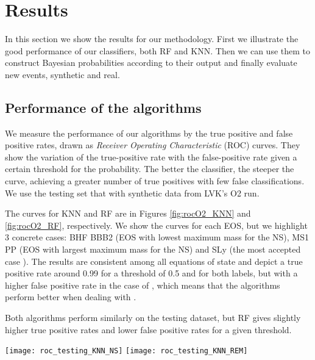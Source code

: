 \section{Results\label{results}}
In this section we show the results for our methodology. First we illustrate the good performance of our classifiers, both \ac{RF} and \ac{KNN}. Then we can use them to construct Bayesian probabilities according to their output and finally evaluate new events, synthetic and real.

\subsection{Performance of the algorithms}
We measure the performance of our algorithms by the true positive and false positive rates, drawn as \textit{Receiver Operating Characteristic} (ROC) curves. They show the variation of the true-positive rate  with the false-positive rate given a certain threshold for the probability.  The better the classifier, the steeper the curve,  achieving a greater number of true positives with few false classifications. We use the testing set that with synthetic data from LVK's O2 run. 

The curves for \ac{KNN}  and \ac{RF} are in Figures \ref{fig:rocO2_KNN} and \ref{fig:rocO2_RF}, respectively.  We show the curves for each EOS, but we highlight 3 concrete cases: BHF BBB2 (EOS with lowest maximum mass for the NS), MS1 PP (EOS with largest maximum mass for the NS) and SLy (the most accepted case \mmt{[?]}). The results are consistent among all equations of state and depict a true positive rate around 0.99 for a threshold of 0.5 and for both labels, but with a higher false positive rate in the case of \hasns, which means that the algorithms perform better when dealing with \hasrem.

Both algorithms perform similarly on the testing dataset, but \ac{RF} gives slightly higher true positive rates and lower false positive rates for a given threshold. 


\begin{figure*}[h]
\texttt{[image: roc\_testing\_KNN\_NS]}
\texttt{[image: roc\_testing\_KNN\_REM]}
\caption{\label{fig:rocO2_KNN}ROC curves for the testing dataset for \ac{KNN} classfier. All 23 EoS shown in grey, in color the EoSs with minimum and maximum mass, along commonly used SLy.}
\end{figure*}

